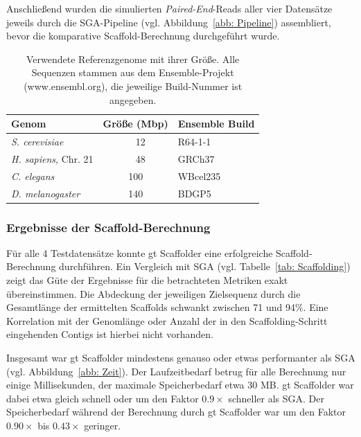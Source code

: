 \documentclass[a4paper,11pt,parskip]{scrartcl}
\begin{document}
Anschließend wurden die simulierten \textit{Paired-End}-Reads aller vier
Datensätze jeweils durch die SGA-Pipeline (vgl. Abbildung~\ref{abb: Pipeline})
assembliert, bevor die komparative Scaffold-Berechnung durchgeführt wurde.

\begin{table}
  \centering
  \begin{tabular}{lcl}
    Genom & Größe (Mbp) & Ensemble Build \\
    \hline
    \textit{S. cerevisiae} &~~12 & R64-1-1 \\
    \textit{H. sapiens}, Chr. 21 &~~48 & GRCh37 \\
    \textit{C. elegans} & 100 & WBcel235 \\
    \textit{D. melanogaster} & 140 & BDGP5
  \end{tabular}
  \caption{\label{tab: Referenzgenome}Verwendete Referenzgenome mit ihrer
  Größe. Alle Sequenzen stammen aus dem Ensemble-Projekt (www.ensembl.org),
  die jeweilige Build-Nummer ist angegeben.}
\end{table}

\subsubsection*{Ergebnisse der Scaffold-Berechnung}

Für alle 4 Testdatensätze konnte gt Scaffolder eine erfolgreiche
Scaffold-Berechnung durchführen. Ein Vergleich mit SGA (vgl.
Tabelle~\ref{tab: Scaffolding}) zeigt das Güte der Ergebnisse für die
betrachteten Metriken exakt übereinstimmen. Die Abdeckung der
jeweiligen Zielsequenz durch die Gesamtlänge der ermittelten Scaffolds
schwankt zwischen 71 und 94\%. Eine Korrelation mit der Genomlänge
oder Anzahl der in den Scaffolding-Schritt eingehenden Contigs ist
hierbei nicht vorhanden.

Insgesamt war gt Scaffolder mindestens genauso oder etwas performanter als
SGA (vgl. Abbildung~\ref{abb: Zeit}). Der Laufzeitbedarf betrug für alle
Berechnung nur einige Millisekunden, der maximale Speicherbedarf etwa 30 MB. gt
Scaffolder war dabei etwa gleich schnell oder um den Faktor $0.9\times$
schneller als SGA. Der Speicherbedarf während der Berechnung durch gt
Scaffolder war um den Faktor $0.90\times$ bis $0.43\times$ geringer.
\end{document}
